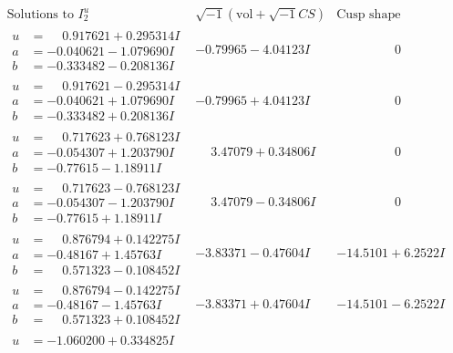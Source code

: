 \documentclass[1p]{elsarticle_modified}
\theoremstyle{definition}
\newcommand{\I}{\sqrt{-1}}
\begin{document}
$$\begin{array}{c|c|c}  
\text{Solutions to }I^u_{2}& \I (\text{vol} + \sqrt{-1}CS) & \text{Cusp shape}\\
 \hline 
\begin{aligned}
u &= \phantom{-}0.917621 + 0.295314 I \\
a &= -0.040621 - 1.079690 I \\
b &= -0.333482 - 0.208136 I\end{aligned}
 & -0.79965 - 4.04123 I & \phantom{-0.000000 } 0 \\ \hline\begin{aligned}
u &= \phantom{-}0.917621 - 0.295314 I \\
a &= -0.040621 + 1.079690 I \\
b &= -0.333482 + 0.208136 I\end{aligned}
 & -0.79965 + 4.04123 I & \phantom{-0.000000 } 0 \\ \hline\begin{aligned}
u &= \phantom{-}0.717623 + 0.768123 I \\
a &= -0.054307 + 1.203790 I \\
b &= -0.77615 - 1.18911 I\end{aligned}
 & \phantom{-}3.47079 + 0.34806 I & \phantom{-0.000000 } 0 \\ \hline\begin{aligned}
u &= \phantom{-}0.717623 - 0.768123 I \\
a &= -0.054307 - 1.203790 I \\
b &= -0.77615 + 1.18911 I\end{aligned}
 & \phantom{-}3.47079 - 0.34806 I & \phantom{-0.000000 } 0 \\ \hline\begin{aligned}
u &= \phantom{-}0.876794 + 0.142275 I \\
a &= -0.48167 + 1.45763 I \\
b &= \phantom{-}0.571323 - 0.108452 I\end{aligned}
 & -3.83371 - 0.47604 I & -14.5101 + 6.2522 I \\ \hline\begin{aligned}
u &= \phantom{-}0.876794 - 0.142275 I \\
a &= -0.48167 - 1.45763 I \\
b &= \phantom{-}0.571323 + 0.108452 I\end{aligned}
 & -3.83371 + 0.47604 I & -14.5101 - 6.2522 I \\ \hline\begin{aligned}
u &= -1.060200 + 0.334825 I \\

\end{aligned}
\end{array}$$
\end{document}

